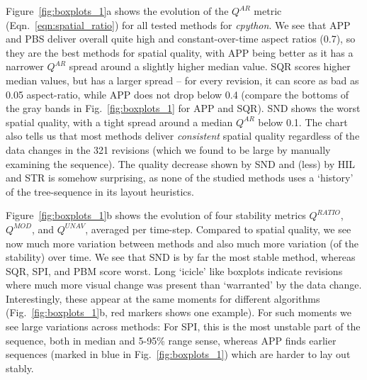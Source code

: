 Figure~\ref{fig:boxplots_1}a shows the evolution of the $Q^{AR}$ metric (Eqn.~\ref{eqn:spatial_ratio}) for all tested methods for \emph{cpython}. We see that APP and PBS deliver overall quite high and constant-over-time aspect ratios (0.7), so they are the best methods for spatial quality, with APP being better as it has a narrower $Q^{AR}$ spread around a slightly higher median value. SQR scores higher median values, but has a larger spread -- for every revision, it can score as bad as 0.05 aspect-ratio, while APP does not drop below 0.4 (compare the bottoms of the gray bands in Fig.~\ref{fig:boxplots_1} for APP and SQR). SND shows the worst spatial quality, with a tight spread around a median $Q^{AR}$ below 0.1. The chart also tells us that most methods deliver \emph{consistent} spatial quality regardless of the data changes in the 321 revisions (which we found to be large by manually examining the sequence). The quality decrease shown by SND and (less) by HIL and STR is somehow surprising, as none of the studied methods uses a `history' of the tree-sequence in its layout heuristics.

Figure~\ref{fig:boxplots_1}b shows the evolution of four stability metrics $Q^{RATIO}$, $Q^{MOD}$, and $Q^{UNAV}$, averaged per time-step. Compared to spatial quality, we see now much more variation between methods and also much more variation (of the stability) over time. We see that SND is by far the most stable method, whereas SQR, SPI, and PBM score worst. Long `icicle' like boxplots indicate revisions where much more visual change was present than `warranted' by the data change. Interestingly, these appear at the same moments for different algorithms (Fig.~\ref{fig:boxplots_1}b, red markers shows one example). For such moments we see large variations across methods: For SPI, this is the most unstable part of the sequence, both in median and 5-95\% range sense, whereas APP finds earlier sequences (marked in blue in Fig.~\ref{fig:boxplots_1}) which are harder to lay out stably.

%
%


